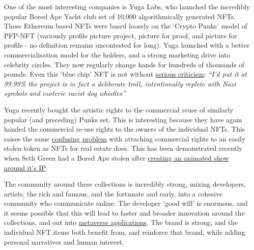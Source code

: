 One of the most interesting companies is Yuga Labs, who launched the incredibly popular Bored Ape Yacht club set of 10,000 algorithmically generated NFTs. These Ethereum based NFTs were based loosely on the `Crypto Punks' model of PFP-NFT (variously profile picture project, picture for proof, and picture for profile - no definition remains uncontested for long). Yuga launched with a better commercialisation model for the holders, and a strong marketing drive into celebrity circles. They now regularly change hands for hundreds of thousands of pounds. Even this `blue chip' NFT is not without \href{https://twitter.com/coryklippsten/status/1538909505236283392}{serious criticism}: \textit{``I'd put it at 99.99\% the project is in fact a deliberate troll, intentionally replete with Nazi symbols and esoteric racist dog whistles''}\par
Yuga recently bought the artistic rights to the commercial reuse of similarly popular (and preceding) Punks set. This is interesting because they have again handed the commercial re-use rights to the owners of the individual NFTs. This raises the same \href{https://www.bloomberg.com/news/articles/2022-03-21/bored-ape-nft-spinoff-venture-gone-sour-sparks-legal-fight}{confusing problem} with attaching commercial rights to an easily stolen token as NFTs for real estate does. This has been demonstrated recently when Seth Green had a Bored Ape stolen after \href{https://www.buzzfeednews.com/article/sarahemerson/seth-green-bored-ape-stolen-tv-show}{creating an animated show around it's IP}.  \par
The community around these collections is incredibly strong, mixing developers, artists, the rich and famous, and the fortunate and early, into a cohesive community who communicate online. The developer `good will' is enormous, and it seems possible that this will lead to faster and broader innovation around the collections, and out into \href{https://twitter.com/yugalabs/status/1505014986556551172?}{metaverse applications}. The brand is strong, and the individual NFT items both benefit from, and reinforce that brand, while adding personal narratives and human interest.\par 
